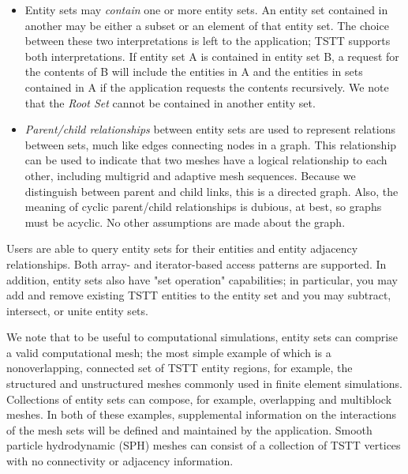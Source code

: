 \begin{itemize}
\item Entity sets may {\it contain} one or more entity sets.  An
entity set contained in another may be either a subset or an element
of that entity set.  The choice between these two interpretations is
left to the application; TSTT supports both interpretations. If entity
set A is contained in entity set B, a request for the contents of B
will include the entities in A and the entities in sets contained in A
if the application requests the contents recursively.  We note that
the {\it Root Set} cannot be contained in another entity set.

\item {\it Parent/child relationships} between entity sets are used to
represent relations between sets, much like edges connecting nodes in
a graph.  This relationship can be used to indicate that two meshes
have a logical relationship to each other, including multigrid and
adaptive mesh sequences. Because we distinguish between parent and
child links, this is a directed graph. Also, the meaning of cyclic
parent/child relationships is dubious, at best, so graphs must be
acyclic. No other assumptions are made about the graph.
\end{itemize}

Users are able to query entity sets for their entities and entity
adjacency relationships.  Both array- and iterator-based access
patterns are supported.  In addition, entity sets also have "set
operation" capabilities; in particular, you may add and remove
existing TSTT entities to the entity set and you may subtract,
intersect, or unite entity sets.  %

We note that to be useful to computational simulations, entity sets
can comprise a valid computational mesh; the most simple example of
which is a nonoverlapping, connected set of TSTT entity regions, for
example, the structured and unstructured meshes commonly used in
finite element simulations.  Collections of entity sets can compose,
for example, overlapping and multiblock meshes. In both of these
examples, supplemental information on the interactions of the mesh sets
will be defined and maintained by the application.  Smooth particle
hydrodynamic (SPH) meshes can consist of a collection of TSTT vertices
with no connectivity or adjacency information.


